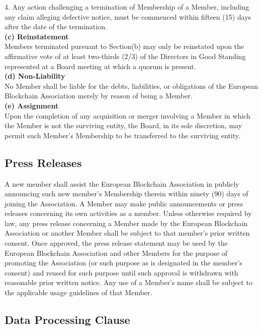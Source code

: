 \documentclass{article}
\begin{document}
4. Any action challenging a termination of Membership of a Member, including any claim alleging defective notice, must be commenced within fifteen (15) days after the date of the termination. \\

\textbf{(c) Reinstatement} \\

Members terminated pursuant to Section(b) may only be reinstated upon the affirmative vote of at least two-thirds (2/3) of the Directors in Good Standing represented at a Board meeting at which a quorum is present. \\

\textbf{(d) Non-Liability} \\

No Member shall be liable for the debts, liabilities, or obligations of the European Blockchain Association merely by reason of being a Member. \\

\textbf{(e) Assignment} \\

Upon the completion of any acquisition or merger involving a Member in which the Member is not the surviving entity, the Board, in its sole discretion, may permit such Member’s Membership to be transferred to the surviving entity.

\subsection{Press Releases}

A new member shall assist the European Blockchain Association in publicly announcing such new member’s Membership therein within ninety (90) days of joining the Association. 
A Member may make public announcements or press releases concerning its own activities as a member. 
Unless otherwise required by law, any press release concerning a Member made by the European Blockchain Association or another Member shall be subject to that member's prior written consent. 
Once approved, the press release statement may be used by the European Blockchain Association and other Members for the purpose of promoting the Association (or such purpose as is designated in the member's consent) and reused for such purpose until such approval is withdrawn with reasonable prior written notice. 
Any use of a Member's name shall be subject to the applicable usage guidelines of that Member.

\subsection{Data Processing Clause}
\end{document}
